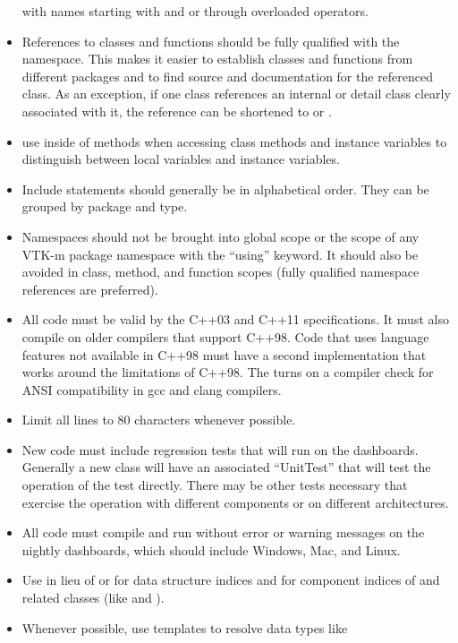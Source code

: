 \begin{itemize}
  with names starting with  and  or through
  overloaded operators.
\item References to classes and functions should be fully qualified with
  the namespace. This makes it easier to establish classes and functions
  from different packages and to find source and documentation for the
  referenced class. As an exception, if one class references an internal or
  detail class clearly associated with it, the reference can be shortened
  to  or .
\item use  inside of methods when accessing class methods
  and instance variables to distinguish between local variables and
  instance variables.
\item Include statements should generally be in alphabetical order. They
  can be grouped by package and type.
\item Namespaces should not be brought into global scope or the scope of
  any VTK-m package namespace with the ``using'' keyword. It should also be
  avoided in class, method, and function scopes (fully qualified namespace
  references are preferred).
\item All code must be valid by the C++03 and C++11 specifications. It must
  also compile on older compilers that support C++98. Code that uses
  language features not available in C++98 must have a second
  implementation that works around the limitations of C++98. The
   turns on a compiler check for ANSI
  compatibility in gcc and clang compilers.
\item Limit all lines to 80 characters whenever possible.
\item New code must include regression tests that will run on the
  dashboards. Generally a new class will have an associated ``UnitTest''
  that will test the operation of the test directly. There may be other
  tests necessary that exercise the operation with different components or
  on different architectures.
\item All code must compile and run without error or warning messages on
  the nightly dashboards, which should include Windows, Mac, and Linux.
\item Use  in lieu of  or  for data
  structure indices and  for component indices of
   and related classes (like  and
  ).
\item Whenever possible, use templates to resolve data types like

\end{itemize}
